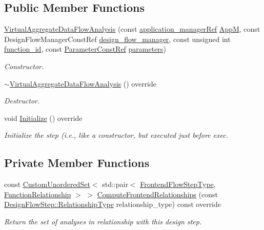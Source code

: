 \subsection*{Public Member Functions}
\begin{DoxyCompactItemize}
\item 
\hyperlink{classVirtualAggregateDataFlowAnalysis_a70ff2a8ecb41e161c60b1016d65543e7}{Virtual\+Aggregate\+Data\+Flow\+Analysis} (const \hyperlink{application__manager_8hpp_a04ccad4e5ee401e8934306672082c180}{application\+\_\+manager\+Ref} \hyperlink{classFrontendFlowStep_a0ac0d8db2a378416583f51c4faa59d15}{AppM}, const Design\+Flow\+Manager\+Const\+Ref \hyperlink{classDesignFlowStep_ab770677ddf087613add30024e16a5554}{design\+\_\+flow\+\_\+manager}, const unsigned int \hyperlink{classFunctionFrontendFlowStep_a58ef2383ad1a212a8d3f396625a4b616}{function\+\_\+id}, const \hyperlink{Parameter_8hpp_a37841774a6fcb479b597fdf8955eb4ea}{Parameter\+Const\+Ref} \hyperlink{classDesignFlowStep_a802eaafe8013df706370679d1a436949}{parameters})
\begin{DoxyCompactList}\small\item\em Constructor. \end{DoxyCompactList}\item 
\hyperlink{classVirtualAggregateDataFlowAnalysis_a0a7d2a546e118b90fcf6c70696877a57}{$\sim$\+Virtual\+Aggregate\+Data\+Flow\+Analysis} () override
\begin{DoxyCompactList}\small\item\em Destructor. \end{DoxyCompactList}\item 
void \hyperlink{classVirtualAggregateDataFlowAnalysis_acafa9a90b201923d66a16fea72ccc9ac}{Initialize} () override
\begin{DoxyCompactList}\small\item\em Initialize the step (i.\+e., like a constructor, but executed just before exec. \end{DoxyCompactList}\end{DoxyCompactItemize}
\subsection*{Private Member Functions}
\begin{DoxyCompactItemize}
\item 
const \hyperlink{classCustomUnorderedSet}{Custom\+Unordered\+Set}$<$ std\+::pair$<$ \hyperlink{frontend__flow__step_8hpp_afeb3716c693d2b2e4ed3e6d04c3b63bb}{Frontend\+Flow\+Step\+Type}, \hyperlink{classFrontendFlowStep_af7cf30f2023e5b99e637dc2058289ab0}{Function\+Relationship} $>$ $>$ \hyperlink{classVirtualAggregateDataFlowAnalysis_a4bd20d214944424a56ea9699b232d597}{Compute\+Frontend\+Relationships} (const \hyperlink{classDesignFlowStep_a723a3baf19ff2ceb77bc13e099d0b1b7}{Design\+Flow\+Step\+::\+Relationship\+Type} relationship\+\_\+type) const override
\begin{DoxyCompactList}\small\item\em Return the set of analyses in relationship with this design step. \end{DoxyCompactList}\end{DoxyCompactItemize}
